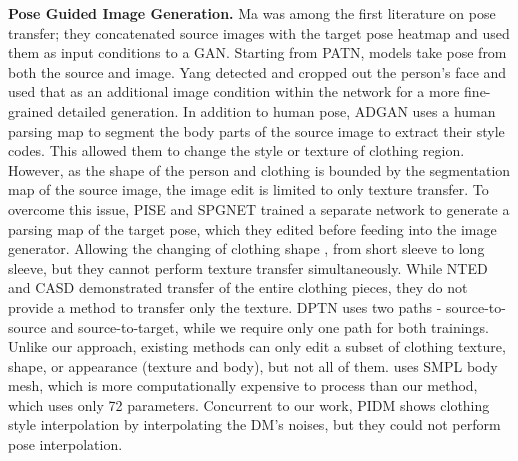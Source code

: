 \documentclass[10pt,twocolumn,letterpaper]{article}
\begin{document}
\textbf{Pose Guided Image Generation.}
Ma \etal \cite{Ma2017} was among the first literature on pose transfer; they concatenated source images with the target pose heatmap and used them as input conditions to a GAN\cite{gan}. Starting from PATN\cite{patn}, models take pose from both the source and image. Yang \etal \cite{Yang2020} detected and cropped out the person's face and used that as an additional image condition within the network for a more fine-grained detailed generation. In addition to human pose, ADGAN \cite{adgan} uses a human parsing map to segment the body parts of the source image to extract their style codes. This allowed them to change the style or texture of clothing region. However, as the shape of the person and clothing is bounded by the segmentation map of the source image, the image edit is limited to only texture transfer. To overcome this issue, PISE \cite{pise} and SPGNET \cite{spgnet} trained a separate network to generate a parsing map of the target pose, which they edited before feeding into the image generator. Allowing the changing of clothing shape  \eg, from short sleeve to long sleeve, but they cannot perform texture transfer simultaneously. While NTED\cite{nted} and CASD\cite{casd} demonstrated transfer of the entire clothing pieces, they do not provide a method to transfer only the texture. DPTN\cite{dptn} uses two paths - source-to-source and source-to-target, while we require only one path for both trainings. Unlike our approach, existing methods can only edit a subset of clothing texture, shape, or appearance (texture and body), but not all of them. \cite{AlBahar2021} uses SMPL body mesh, which is more computationally expensive to process than our method, which uses only 72 parameters. Concurrent to our work, PIDM\cite{persion_dm} shows clothing style interpolation by interpolating the DM's noises, but they could not perform pose interpolation. 
\end{document}

